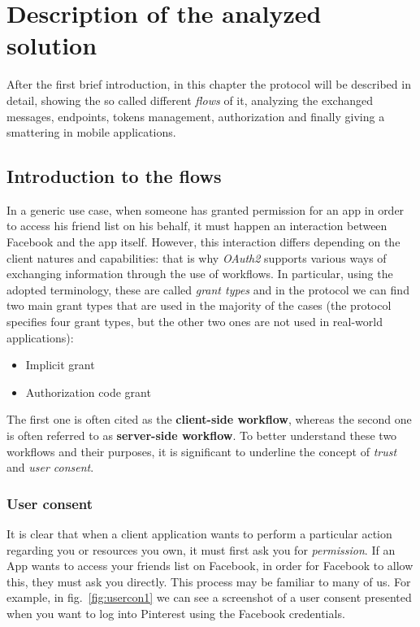 \chapter{Description of the analyzed solution}
After the first brief introduction, in this chapter the protocol will be described in detail, showing the so called different \textit{flows} of it, analyzing the exchanged messages, endpoints, tokens management, authorization and finally giving a smattering in mobile applications.
\minitoc

\section{Introduction to the flows}\label{section22}
In a generic use case, when someone has granted permission for an app in order to access his friend list on his behalf, it must happen an interaction between Facebook and the app itself. However, this interaction differs depending on the client natures and capabilities: that is why \textit{OAuth2} supports various ways of exchanging information through the use of workflows.
In particular, using the adopted terminology, these are called \textit{grant types} and in the protocol we can find two main grant types that are used in the majority of the cases (the protocol specifies four grant types, but the other two ones are not used in real-world applications):

\begin{itemize}
    \item Implicit grant
    \item Authorization code grant
\end{itemize}

The first one is often cited as the \textbf{client-side workflow}, whereas the second one is often referred to as \textbf{server-side workflow}.
To better understand these two workflows and their purposes, it is significant to underline the concept of \textit{trust} and \textit{user consent}.

\subsection{User consent}
It is clear that when a client application wants to perform a particular action regarding you or resources you own, it must first ask you for \textit{permission}. If an App wants to access your friends list on Facebook, in order for Facebook to allow this, they must ask you directly. This process may be familiar to many of us. For example, in fig.~\ref{fig:usercon1} we can see a screenshot of a user consent presented when you want to log into Pinterest using the Facebook credentials.

